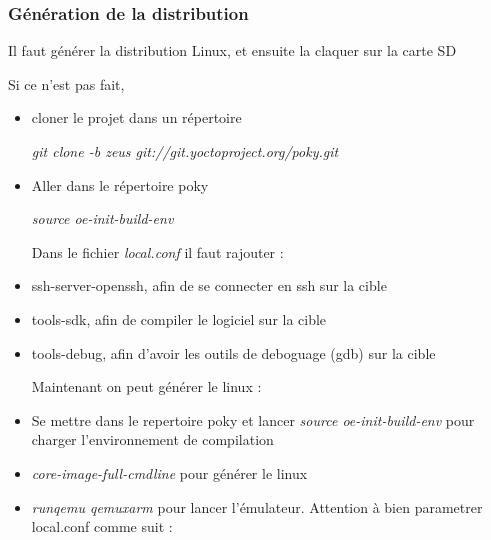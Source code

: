 \subsubsection{Génération de la distribution}
Il faut générer la distribution Linux, et ensuite la claquer sur la carte SD

Si ce n'est pas fait,
\begin{itemize}
\item 
 cloner le projet dans un répertoire


\textit{git clone -b zeus git://git.yoctoproject.org/poky.git}

\item 
Aller dans le répertoire poky

\textit{source oe-init-build-env}

Dans le fichier \textit{local.conf} il faut rajouter : 

\item ssh-server-openssh, afin de se connecter en ssh sur la cible
\item tools-sdk, afin de compiler le logiciel sur la cible
\item tools-debug, afin d'avoir les outils de deboguage (gdb) sur la cible




Maintenant on peut générer le linux : 
\item 
Se mettre dans le repertoire poky et lancer \textit{source oe-init-build-env} pour charger l'environnement de compilation

\item 
\textit{core-image-full-cmdline} pour générer le linux

\item 
\textit{runqemu qemuxarm} pour lancer l'émulateur.
Attention à bien parametrer local.conf comme suit : 
\\




\end{itemize}

